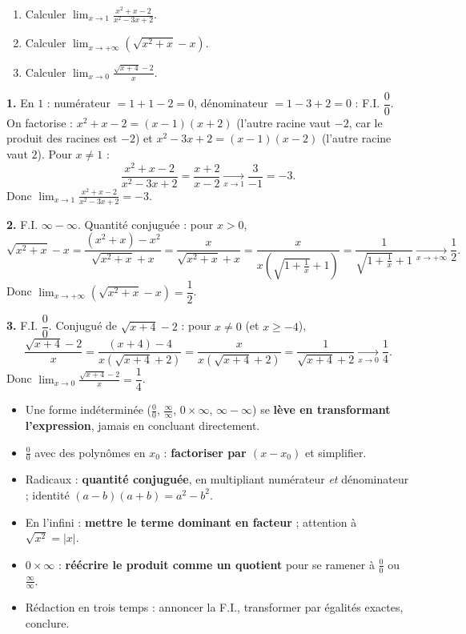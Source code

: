 \documentclass[11pt]{article}
\begin{document}
\begin{exercice}
\begin{enumerate}
\item Calculer $\displaystyle\lim_{x \to 1} \frac{x^2 + x - 2}{x^2 - 3x + 2}$.
\item Calculer $\displaystyle\lim_{x \to +\infty} \left(\sqrt{x^2 + x} - x\right)$.
\item Calculer $\displaystyle\lim_{x \to 0} \frac{\sqrt{x+4} - 2}{x}$.
\end{enumerate}
\end{exercice}

\begin{corrige}
\textbf{1.} En $1$ : numérateur $= 1 + 1 - 2 = 0$, dénominateur $= 1 - 3 + 2 = 0$ : F.I. $\dfrac{0}{0}$. On factorise : $x^2 + x - 2 = (x-1)(x+2)$ (l'autre racine vaut $-2$, car le produit des racines est $-2$) et $x^2 - 3x + 2 = (x-1)(x-2)$ (l'autre racine vaut $2$). Pour $x \neq 1$ :
\[ \frac{x^2+x-2}{x^2-3x+2} = \frac{x+2}{x-2} \xrightarrow[x \to 1]{} \frac{3}{-1} = -3. \]
Donc $\displaystyle\lim_{x \to 1} \frac{x^2 + x - 2}{x^2 - 3x + 2} = -3$.

\textbf{2.} F.I. $\infty - \infty$. Quantité conjuguée : pour $x > 0$,
\[ \sqrt{x^2+x} - x = \frac{(x^2+x) - x^2}{\sqrt{x^2+x} + x} = \frac{x}{\sqrt{x^2+x} + x} = \frac{x}{x\left(\sqrt{1+\frac{1}{x}} + 1\right)} = \frac{1}{\sqrt{1+\frac{1}{x}} + 1} \xrightarrow[x \to +\infty]{} \frac{1}{2}. \]
Donc $\displaystyle\lim_{x \to +\infty} \left(\sqrt{x^2 + x} - x\right) = \dfrac{1}{2}$.

\textbf{3.} F.I. $\dfrac{0}{0}$. Conjugué de $\sqrt{x+4} - 2$ : pour $x \neq 0$ (et $x \geq -4$),
\[ \frac{\sqrt{x+4}-2}{x} = \frac{(x+4)-4}{x\left(\sqrt{x+4}+2\right)} = \frac{x}{x\left(\sqrt{x+4}+2\right)} = \frac{1}{\sqrt{x+4}+2} \xrightarrow[x \to 0]{} \frac{1}{4}. \]
Donc $\displaystyle\lim_{x \to 0} \frac{\sqrt{x+4} - 2}{x} = \dfrac{1}{4}$.
\end{corrige}

\begin{aretenir}
\begin{itemize}
\item Une forme indéterminée ($\frac{0}{0}$, $\frac{\infty}{\infty}$, $0 \times \infty$, $\infty - \infty$) se \textbf{lève en transformant l'expression}, jamais en concluant directement.
\item $\frac{0}{0}$ avec des polynômes en $x_0$ : \textbf{factoriser par $(x - x_0)$} et simplifier.
\item Radicaux : \textbf{quantité conjuguée}, en multipliant numérateur \emph{et} dénominateur ; identité $(a-b)(a+b) = a^2 - b^2$.
\item En l'infini : \textbf{mettre le terme dominant en facteur} ; attention à $\sqrt{x^2} = |x|$.
\item $0 \times \infty$ : \textbf{réécrire le produit comme un quotient} pour se ramener à $\frac{0}{0}$ ou $\frac{\infty}{\infty}$.
\item Rédaction en trois temps : annoncer la F.I., transformer par égalités exactes, conclure.
\end{itemize}
\end{aretenir}
\end{document}
